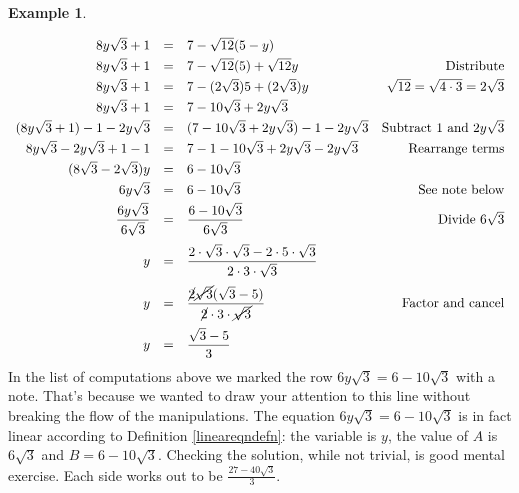 \documentclass[11pt]{article}
\theoremstyle{definition}  %
\newtheorem{ex}{\bf Example}[section]
\begin{document}
\begin{ex}
\begin{enumerate}
\[\begin{array}{rclr}
8 y \sqrt{3} + 1 & = & 7 - \sqrt{12}(5 - y) & \\ [3pt]

8 y \sqrt{3} + 1 & = & 7 - \sqrt{12}(5)  + \sqrt{12} y & \text{Distribute} \\ [3pt]

8 y \sqrt{3} + 1 & = & 7 - (2 \sqrt{3})5 + (2 \sqrt{3})y & \text{$\sqrt{12} = \sqrt{4\cdot 3} = 2 \sqrt{3}$} \\ [3pt]

8 y \sqrt{3} + 1 & = & 7 - 10 \sqrt{3} + 2y \sqrt{3}  &  \\ [3pt]

(8 y \sqrt{3} + 1) - 1 - 2y\sqrt{3} & = & (7 - 10 \sqrt{3} + 2y \sqrt{3}) - 1 - 2y\sqrt{3}  & \text{Subtract $1$ and $2y\sqrt{3}$}  \\ [3pt]

8 y \sqrt{3} - 2y\sqrt{3} + 1 - 1 & = & 7 - 1 - 10 \sqrt{3} + 2y \sqrt{3}  - 2y\sqrt{3}  & \text{Rearrange terms}  \\ [3pt]

(8\sqrt{3}-2\sqrt{3})y & = & 6 - 10 \sqrt{3}  & \\ [3pt]

6 y \sqrt{3} & = & 6 - 10 \sqrt{3}  &  \text{See note below} \\ [3pt]

\dfrac{6 y \sqrt{3}}{6 \sqrt{3}}  & = & \dfrac{6 - 10 \sqrt{3}}{6 \sqrt{3}}  & \text{Divide $6\sqrt{3}$} \\ [12pt]

y & = & \dfrac{2 \cdot \sqrt{3} \cdot \sqrt{3} - 2 \cdot 5 \cdot \sqrt{3}}{2 \cdot 3 \cdot \sqrt{3}} & \\ [12pt]

y & = & \dfrac{\cancel{2} \cancel{\sqrt{3}}(\sqrt{3} - 5)}{\cancel{2} \cdot 3 \cdot \cancel{\sqrt{3}}} &  \text{Factor and cancel} \\ [12pt]

y & = & \dfrac{\sqrt{3} - 5}{3} & \\ \end{array}\]In the list of computations above we marked the row $6 y \sqrt{3} = 6 - 10 \sqrt{3}$ with a note.  That's because we wanted to draw your attention to this line without breaking the flow of the manipulations.  The equation $6 y \sqrt{3} = 6 - 10 \sqrt{3}$ is in fact linear according to Definition \ref{lineareqndefn}: the variable is $y$, the value of $A$ is $6\sqrt{3}$ and $B = 6 - 10 \sqrt{3}$. Checking the solution, while not trivial, is good mental exercise.  Each side works out to be $\frac{27 - 40 \sqrt{3}}{3}$.


\end{enumerate}
\end{ex}
\end{document}
